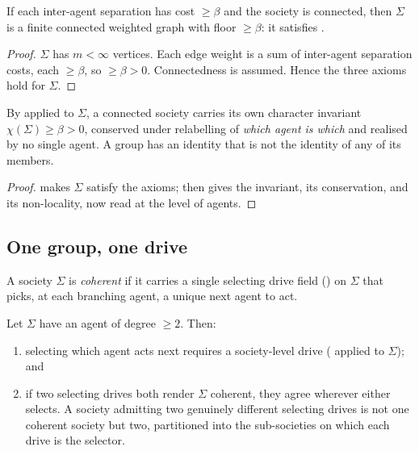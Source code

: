 \documentclass[11pt,twocolumn,a4paper]{article}
\newcommand{\floorc}{\beta}          %
\newcommand{\Char}{\chi}             %
\newcommand{\Soc}{\Sigma}            %
\begin{document}
\begin{lemma}
\label{lem:society-graph}
If each inter-agent separation has cost $\ge\floorc$ and the society is
connected, then $\Soc$ is a finite connected weighted graph with floor
$\ge\floorc$: it satisfies .
\end{lemma}

\begin{proof}
$\Soc$ has $m<\infty$ vertices. Each edge weight is a sum of inter-agent
separation costs, each $\ge\floorc$, so $\ge\floorc>0$. Connectedness is
assumed. Hence the three axioms hold for $\Soc$.
\end{proof}

\begin{corollary}
\label{cor:society-identity}
By  applied to $\Soc$, a connected society carries its
own character invariant $\Char(\Soc)\ge\floorc>0$, conserved under
relabelling of \emph{which agent is which} and realised by no single
agent. A group has an identity that is not the identity of any of its
members.
\end{corollary}

\begin{proof}
 makes $\Soc$ satisfy the axioms;
 then gives the invariant, its conservation, and its
non-locality, now read at the level of agents.
\end{proof}

\subsection{One group, one drive}

\begin{definition}
\label{def:coherent}
A society $\Soc$ is \emph{coherent} if it carries a single selecting drive
field () on $\Soc$ that picks, at each branching agent, a
unique next agent to act.
\end{definition}

\begin{theorem}
\label{thm:onedrive}
Let $\Soc$ have an agent of degree $\ge2$. Then:
\begin{enumerate}[label=\textup{(\roman*)},leftmargin=2.2em]
\item selecting which agent acts next requires a society-level drive
( applied to $\Soc$); and
\item if two selecting drives both render $\Soc$ coherent, they agree
wherever either selects. A society admitting two genuinely different
selecting drives is not one coherent society but two, partitioned into the
sub-societies on which each drive is the selector.
\end{enumerate}
\end{theorem}
\end{document}
